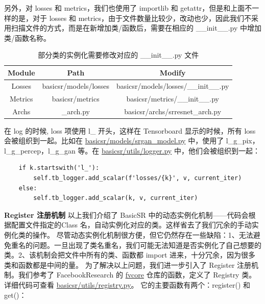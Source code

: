 \documentclass[../main.tex]{subfiles}
\begin{document}
    另外，对 losses 和 metrics，我们也使用了 importlib 和 getattr，但是和上面不一样的是，对于 losses 和 metrics，由于文件数量比较少，改动也少，因此我们不采用扫描文件的方式，而是在新增加类/函数后，需要在相应的 \_\_init\_\_.py 中增加类/函数名称。
    \begin{table}[h]
    \centering
    \begin{tabular}{|c|c|c|}
    \hline
    \textbf{Module} & \textbf{Path} & \textbf{Modify} \\ \hline
    Losses & basicsr/models/losses & basicsr/models/losses/\_\_init\_\_.py \\ \hline
    Metrics & basicsr/metrics & basicsr/metrics/\_\_init\_\_.py \\ \hline
    Archs & \_arch.py & basicsr/archs/srresnet\_arch.py \\ \hline
    \end{tabular}
    \caption{部分类的实例化需要修改对应的 \_\_init\_\_.py 文件}
    \end{table}
    在 log 的时候, loss 项使用 l\_ 开头，这样在 Tensorboard 显示的时候，所有 loss 会被组织到一起。比如在 \href{https://github.com/XPixelGroup/BasicSR/blob/master/basicsr/models/srgan_model.py}{basicsr/models/srgan\_model.py} 中，使用了 l\_g\_pix，l\_g\_percep，l\_g\_gan 等。在 \href{https://github.com/XPixelGroup/BasicSR/blob/master/basicsr/utils/logger.py}{basicsr/utils/logger.py} 中，他们会被组织到一起：
    \begin{verbatim}
    if k.startswith('l_'):
        self.tb_logger.add_scalar(f'losses/{k}', v, current_iter)
    else:
        self.tb_logger.add_scalar(k, v, current_iter)
    \end{verbatim}
    \textbf{Register 注册机制}
    以上我们介绍了 BasicSR 中的动态实例化机制——代码会根据配置文件指定的Class 名，自动实例化对应的类。这样省去了我们冗余的手动实例化类的操作。
    尽管动态实例化机制很方便，但它仍然存在一些缺陷：1、无法避免重名的问题。一旦出现了类名重名，我们可能无法知道是否实例化了自己想要的类。2、该机制会把文件中所有的类、函数都 import 进来，十分冗余，因为很多类和函数都是中间的量。
    为了解决以上问题，我们进一步引入了 Register 注册机制。我们参考了 FacebookResearch 的 \href{https://github.com/facebookresearch/fvcore}{fvcore} 仓库的函数，定义了 Registry 类。详细代码可查看 \href{https://github.com/XPixelGroup/BasicSR/blob/master/basicsr/utils/registry.py}{basicsr/utils/registry.py}。
    它的主要函数有两个：register() 和 get()：
\end{document}
